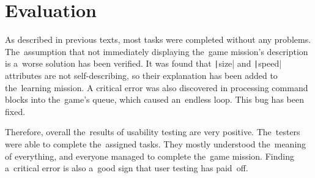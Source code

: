 \section{Evaluation}

As described in previous texts, most tasks were completed without any problems.
The~assumption that not immediately displaying the~game mission's description is a~worse solution has been verified.
It was found that \texttt|size| and \texttt|speed| attributes are not self-describing, so their explanation has been added to the~learning mission.
A critical error was also discovered in processing command blocks into the~game's queue, which caused an~endless loop.
This bug has been fixed.

Therefore, overall the~results of usability testing are very positive.
\linebreak
The~testers were able to complete the~assigned tasks.
They mostly understood the~meaning of everything, and everyone managed to complete the~game mission.
Finding a~critical error is also a~good sign that user testing has paid~off.
